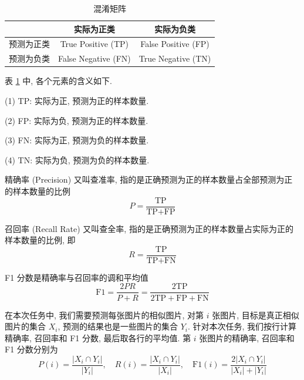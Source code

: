 \documentclass[12pt]{article}
\begin{document}
\begin{table}[htbp]
  \centering
  \caption{混淆矩阵}
  \label{tab:confusion_matrix}
  \begin{tabular}{ccc}
    \toprule
    & 实际为正类 & 实际为负类 \\
    \midrule
    预测为正类 & True Positive (TP) & False Positive (FP)\\
    预测为负类 & False Negative (FN) & True Negative (TN) \\
    \bottomrule
  \end{tabular}
\end{table}

表 \ref{tab:confusion_matrix} 中, 各个元素的含义如下.

(1) TP: 实际为正, 预测为正的样本数量.

(2) FP: 实际为负, 预测为正的样本数量.

(3) FN: 实际为正, 预测为负的样本数量.

(4) TN: 实际为负, 预测为负的样本数量.


精确率 (Precision) 又叫查准率, 指的是正确预测为正的样本数量占全部预测为正的样本数量的比例
\begin{equation}
  P = \frac{\text{TP}}{\text{TP}+\text{FP}}
\end{equation}

召回率 (Recall Rate) 又叫查全率, 指的是正确预测为正的样本数量占实际为正的样本数量的比例, 即
\begin{equation}
  R = \frac{\text{TP}}{\text{TP}+\text{FN}}
\end{equation}

F1 分数是精确率与召回率的调和平均值
\begin{equation}
  \text{F1} = \frac{2PR}{P+R} = \frac{2\text{TP}}{2\text{TP}+\text{FP}+\text{FN}}
\end{equation}

在本次任务中, 我们需要预测每张图片的相似图片, 对第 $i$ 张图片, 目标是真正相似图片的集合 $X_i$, 预测的结果也是一些图片的集合 $Y_i$. 针对本次任务, 我们按行计算精确率, 召回率和 F1 分数, 最后取各行的平均值. 第 $i$ 张图片的精确率, 召回率和 F1 分数分别为
\begin{equation}
  P(i) = \frac{|X_i\cap Y_i|}{|Y_i|},\quad
  R(i) = \frac{|X_i\cap Y_i|}{|X_i|},\quad
  \text{F1}(i) = \frac{2|X_i\cap Y_i|}{|X_i|+|Y_i|}
\end{equation}
\end{document}
